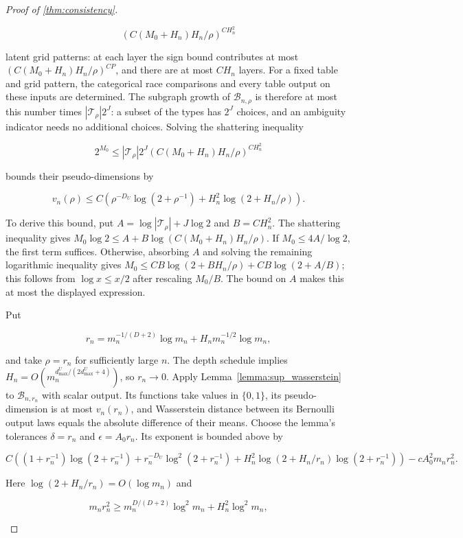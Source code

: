 \begin{proof}[Proof of \cref{thm:consistency}]
\begin{enumerate}
\[
(C(M_0+H_n)H_n/\rho)^{C H_n^2}
\]

latent grid patterns: at each layer the sign bound contributes at most $(C(M_0+H_n)H_n/\rho)^{C P}$, and there are at most $C H_n$ layers. For a fixed table and grid pattern, the categorical race comparisons and every table output on these inputs are determined. The subgraph growth of $\mathcal B_{n,\rho}$ is therefore at most this number times $|\mathcal T_\rho|2^J$: a subset of the types has $2^J$ choices, and an ambiguity indicator needs no additional choices. Solving the shattering inequality

\[
2^{M_0}\leqslant|\mathcal T_\rho|2^J(C(M_0+H_n)H_n/\rho)^{C H_n^2}
\]

bounds their pseudo-dimensions by

\[
v_n(\rho)\leqslant C\left(\rho^{-D_U}\log(2+\rho^{-1})+H_n^2\log(2+H_n/\rho)\right).
\]

To derive this bound, put $A=\log|\mathcal T_\rho|+J\log2$ and $B=C H_n^2$. The shattering inequality gives $M_0\log2\leqslant A+B\log(C(M_0+H_n)H_n/\rho)$. If $M_0\leqslant4A/\log2$, the first term suffices. Otherwise, absorbing $A$ and solving the remaining logarithmic inequality gives $M_0\leqslant C B\log(2+BH_n/\rho)+C B\log(2+A/B)$; this follows from $\log x\leqslant x/2$ after rescaling $M_0/B$. The bound on $A$ makes this at most the displayed expression. 

Put

\[
r_n=m_n^{-1/(D+2)}\log m_n+H_n m_n^{-1/2}\log m_n,
\]

and take $\rho=r_n$ for sufficiently large $n$. The depth schedule implies $H_n=O(m_n^{d_{\max}^U/(2d_{\max}^U+4)})$, so $r_n\rightarrow0$. Apply Lemma~\ref{lemma:sup_wasserstein} to $\mathcal B_{n,r_n}$ with scalar output. Its functions take values in $\{0,1\}$, its pseudo-dimension is at most $v_n(r_n)$, and Wasserstein distance between its Bernoulli output laws equals the absolute difference of their means. Choose the lemma's tolerances $\delta=r_n$ and $\epsilon=A_0r_n$. Its exponent is bounded above by

\[
C\left((1+r_n^{-1})\log(2+r_n^{-1})+r_n^{-D_U}\log^2(2+r_n^{-1})+H_n^2\log(2+H_n/r_n)\log(2+r_n^{-1})\right)-cA_0^2m_nr_n^2.
\]

Here $\log(2+H_n/r_n)=O(\log m_n)$ and

\[
m_nr_n^2\geqslant m_n^{D/(D+2)}\log^2m_n+H_n^2\log^2m_n,
\]


\end{enumerate}
\end{proof}
